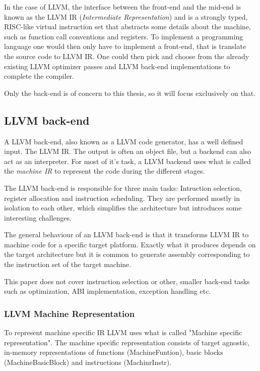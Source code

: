 In the case of LLVM, the interface between the front-end and the mid-end is known as the
LLVM IR (\textit{Intermediate Representation}) and is a strongly typed, RISC-like virtual
instruction set that abstracts some details about the machine, such as function call
conventions and registers. To implement a programming language one would then only have to
implement a front-end, that is translate the source code to LLVM IR. One could then pick
and choose from the already existing LLVM optimizer passes and LLVM back-end implementations
to complete the compiler.

Only the back-end is of concern to this thesis, so it will focus exclusively on that.

\subsection{LLVM back-end}

A LLVM back-end, also known as a LLVM code generator, has a well defined input. The
LLVM IR. The output is often an object file, but a backend can also act as an interpreter.
For most of it's task, a LLVM backend uses what is called the \textit{machine IR} to represent
the code during the different stages.

The LLVM back-end is responsible for three main tasks: Intruction selection, register
allocation and instruction scheduling. They are performed mostly in isolation to each
other, which simplifies the architecture but introduces some interesting challenges.

The general behaviour of an LLVM back-end is that it transforms LLVM IR to machine code
for a specific target platform. Exactly what it produces depends on the target architecture
but it is common to generate assembly corresponding to the instruction set of the target
machine.

This paper does not cover instruction selection or other, smaller back-end tasks such as
optimization, ABI implementation, exception handling etc.

\subsubsection{LLVM Machine Representation}

To represent machine specific IR LLVM uses what is called "Machine specific representation".
The machine specific representation consists of target agnostic, in-memory representations
of functions (MachineFuntion), basic blocks (MachineBasicBlock) and instructions (MachinrInstr).

